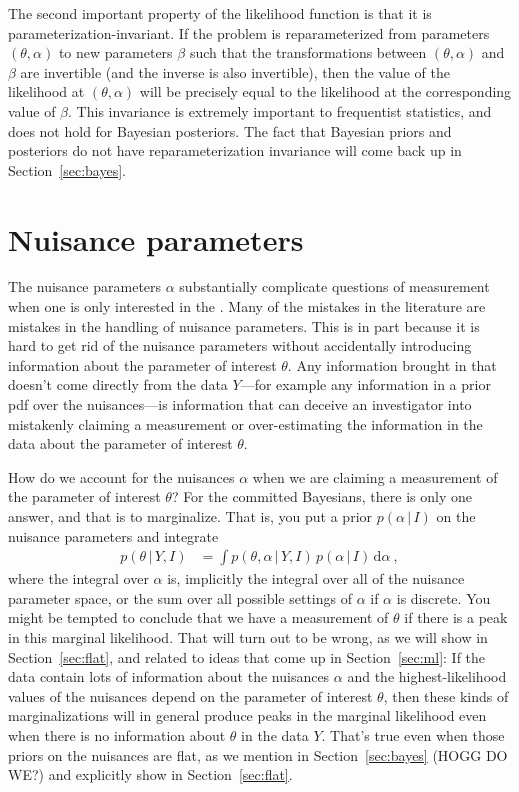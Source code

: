 \documentclass{article}
\newcommand{\sectionname}{Section}
\newcommand{\secref}[1]{\sectionname~\ref{#1}}
\newcommand{\dd}{\mathrm{d}}
\newcommand{\given}{\,|\,}
\begin{document}
The second important property of the likelihood function is that it is par\-am\-e\-ter\-i\-za\-tion-invariant.
If the problem is reparameterized from parameters $(\theta,\alpha)$ to new parameters $\beta$ such that the transformations between $(\theta,\alpha)$ and $\beta$ are invertible (and the inverse is also invertible), then the value of the likelihood at $(\theta,\alpha)$ will be precisely equal to the likelihood at the corresponding value of $\beta$.
This invariance is extremely important to frequentist statistics, and does not hold for Bayesian posteriors.
The fact that Bayesian priors and posteriors do not have reparameterization invariance will come back up in \secref{sec:bayes}.

\section{Nuisance parameters}\label{sec:nuisance}
The nuisance parameters $\alpha$ substantially complicate questions of measurement when one is only interested in the .
Many of the mistakes in the literature are mistakes in the handling of nuisance parameters.
This is in part because it is hard to get rid of the nuisance parameters without accidentally introducing information about the parameter of interest $\theta$.
Any information brought in that doesn't come directly from the data $Y$---for example any information in a prior pdf over the nuisances---is information that can deceive an investigator into mistakenly claiming a measurement or over-estimating the information in the data about the parameter of interest $\theta$.

How do we account for the nuisances $\alpha$ when we are claiming a measurement of the parameter of interest $\theta$?
For the committed Bayesians, there is only one answer, and that is to marginalize.
That is, you put a prior $p(\alpha\given I)$ on the nuisance parameters and integrate
\begin{align}
    p(\theta\given Y,I) &= \int p(\theta,\alpha\given Y,I)\,p(\alpha\given I)\,\dd\alpha ~,\label{eq:marginallf}
\end{align}
where the integral over $\alpha$ is, implicitly the integral over all of the nuisance parameter space, or the sum over all possible settings of $\alpha$ if $\alpha$ is discrete.
You might be tempted to conclude that we have a measurement of $\theta$ if there is a peak in this marginal likelihood.
That will turn out to be wrong, as we will show in \secref{sec:flat}, and related to ideas that come up in \secref{sec:ml}:
If the data contain lots of information about the nuisances $\alpha$ and the highest-likelihood values of the nuisances depend on the parameter of interest $\theta$, then these kinds of marginalizations will in general produce peaks in the marginal likelihood even when there is no information about $\theta$ in the data $Y$.
That's true even when those priors on the nuisances are flat, as we mention in \secref{sec:bayes} (HOGG DO WE?) and explicitly show in \secref{sec:flat}.
\end{document}
